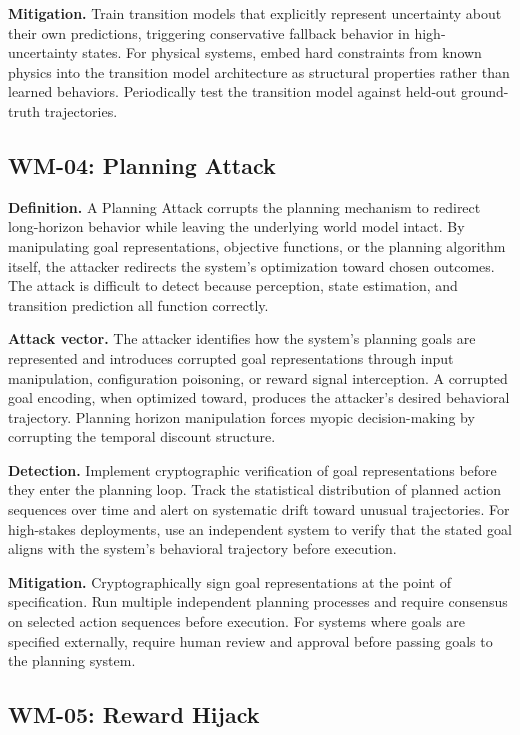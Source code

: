 \documentclass[11pt,a4paper]{article}
\begin{document}
\textbf{Mitigation.} Train transition models that explicitly represent uncertainty about their own predictions, triggering conservative fallback behavior in high-uncertainty states. For physical systems, embed hard constraints from known physics into the transition model architecture as structural properties rather than learned behaviors. Periodically test the transition model against held-out ground-truth trajectories.

\subsection{WM-04: Planning Attack}

\textbf{Definition.} A Planning Attack corrupts the planning mechanism to redirect long-horizon behavior while leaving the underlying world model intact. By manipulating goal representations, objective functions, or the planning algorithm itself, the attacker redirects the system's optimization toward chosen outcomes. The attack is difficult to detect because perception, state estimation, and transition prediction all function correctly.

\textbf{Attack vector.} The attacker identifies how the system's planning goals are represented and introduces corrupted goal representations through input manipulation, configuration poisoning, or reward signal interception. A corrupted goal encoding, when optimized toward, produces the attacker's desired behavioral trajectory. Planning horizon manipulation forces myopic decision-making by corrupting the temporal discount structure.

\textbf{Detection.} Implement cryptographic verification of goal representations before they enter the planning loop. Track the statistical distribution of planned action sequences over time and alert on systematic drift toward unusual trajectories. For high-stakes deployments, use an independent system to verify that the stated goal aligns with the system's behavioral trajectory before execution.

\textbf{Mitigation.} Cryptographically sign goal representations at the point of specification. Run multiple independent planning processes and require consensus on selected action sequences before execution. For systems where goals are specified externally, require human review and approval before passing goals to the planning system.

\subsection{WM-05: Reward Hijack}
\end{document}

